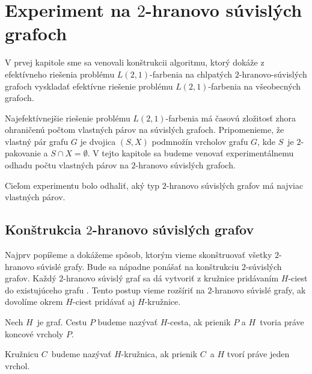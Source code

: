 \chapter{Experiment na $2$-hranovo súvislých grafoch}

V prvej kapitole sme sa venovali konštrukcii algoritmu, ktorý dokáže z efektívneho riešenia
problému $L(2,1)$-farbenia na chlpatých $2$-hranovo-súvislých grafoch vyskladať efektívne
riešenie problému $L(2,1)$-farbenia na všeobecných grafoch.

Najefektívnejšie riešenie problému $L(2,1)$-farbenia má časovú zložitosť zhora ohraničenú
počtom vlastných párov na súvislých grafoch. Pripomenieme, že vlastný pár grafu $G$ je
dvojica $(S, X)$ podmnožín vrcholov grafu $G$, kde $S$ je $2$-pakovanie a $S \cap X = \emptyset$.
V tejto kapitole sa budeme venovať experimentálnemu odhadu počtu vlastných párov na
$2$-hranovo súvislých grafoch.

Cieľom experimentu bolo odhaliť, aký typ $2$-hranovo súvislých grafov má najviac
vlastných párov.

\section{Konštrukcia $2$-hranovo súvislých grafov}

Najprv popíšeme a dokážeme spôsob, ktorým vieme skonštruovať všetky $2$-hranovo
súvislé grafy. Bude sa nápadne ponášať na konštrukciu $2$-súvislých grafov. Každý
$2$-hranovo súvislý graf sa dá vytvoriť z kružnice pridávaním $H$-ciest do existujúceho
grafu \cite{diestel_graph}. Tento postup vieme rozšíriť na $2$-hranovo súvislé grafy, ak
dovolíme okrem $H$-ciest pridávať aj $H$-kružnice.

\begin{defn}
    Nech $H$ je graf. Cestu $P$ budeme nazývať $H$-cesta, ak prienik $P$ a $H$ tvoria
    práve koncové vrcholy $P$.

    Kružnicu $C$ budeme nazývať $H$-kružnica, ak prienik $C$ a $H$ tvorí
    práve jeden vrchol.
\end{defn}

